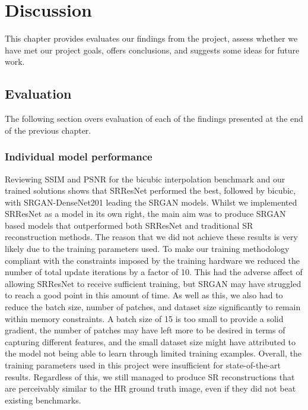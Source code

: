 \chapter{Discussion}
\label{chapter4}
This chapter provides evaluates our findings from the project, assess whether we have met our project goals, offers conclusions, and suggests some ideas for future work.

\section{Evaluation}
The following section overs evaluation of each of the findings presented at the end of the previous chapter.

\subsection{Individual model performance}
Reviewing SSIM and PSNR for the bicubic interpolation benchmark and our trained solutions shows that SRResNet performed the best, followed by bicubic, with SRGAN-DenseNet201 leading the SRGAN models. Whilst we implemented SRResNet as a model in its own right, the main aim was to produce SRGAN based models that outperformed both SRResNet and traditional SR reconstruction methods. The reason that we did not achieve these results is very likely due to the training parameters used. To make our training methodology compliant with the constraints imposed by the training hardware we reduced the number of total update iterations by a factor of 10. This had the adverse affect of allowing SRResNet to receive sufficient training, but SRGAN may have struggled to reach a good point in this amount of time. As well as this, we also had to reduce the batch size, number of patches, and dataset size significantly to remain within memory constraints. A batch size of 15 is too small to provide a solid gradient, the number of patches may have left more to be desired in terms of capturing different features, and the small dataset size might have attributed to the model not being able to learn through limited training examples. Overall, the training parameters used in this project were insufficient for state-of-the-art results. Regardless of this, we still managed to produce SR reconstructions that are perceivably similar to the HR ground truth image, even if they did not beat existing benchmarks.

